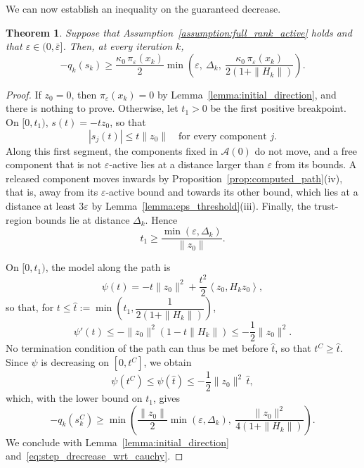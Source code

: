 \documentclass{article}
\numberwithin{equation}{section}
\newcommand{\calA}{{\mathcal{A}}}
\newcommand{\inner}[2]{\left\langle {#1} , {#2} \right\rangle} %
\theoremstyle{plain}
\newtheorem{theorem}{Theorem}
\begin{document}
We can now establish an inequality on the guaranteed decrease.
\begin{theorem}\label{theo:cauchy_decrease}
	Suppose that Assumption~\ref{assumption:full_rank_active} holds and that $\varepsilon \in (0,\bar\varepsilon]$. Then, at every iteration $k$,
	\begin{equation}\label{eq:bound_step_decrease}
		-q_k(s_k) \ge \frac{\kappa_0\,\pi_\varepsilon(x_k)}{2}\min\left(\varepsilon,\ \Delta_k,\ \frac{\kappa_0\,\pi_\varepsilon(x_k)}{2(1+\|H_k\|)}\right).
	\end{equation}
\end{theorem}
\begin{proof}
	If $z_0 = 0$, then $\pi_\varepsilon(x_k) = 0$ by Lemma~\ref{lemma:initial_direction}, and there is nothing to prove. Otherwise, let $t_1 > 0$ be the first positive breakpoint. On $[0,t_1)$, $s(t) = -tz_0$, so that
	\[|s_j(t)| \le t\|z_0\| \quad \text{for every component } j.\]
	Along this first segment, the components fixed in $\calA(0)$ do not move, and a free component that is not $\varepsilon$-active lies at a distance larger than $\varepsilon$ from its bounds. A released component moves inwards by Proposition~\ref{prop:computed_path}(iv), that is, away from its $\varepsilon$-active bound and towards its other bound, which lies at a distance at least $3\varepsilon$ by Lemma~\ref{lemma:eps_threshold}(iii). Finally, the trust-region bounds lie at distance $\Delta_k$. Hence
	\[t_1 \ge \frac{\min(\varepsilon,\Delta_k)}{\|z_0\|}.\]

	On $[0,t_1)$, the model along the path is
	\[\psi(t) = -t\|z_0\|^2 + \frac{t^2}{2}\inner{z_0}{H_kz_0},\]
	so that, for $t \le \hat{t} := \min\left(t_1, \dfrac{1}{2(1+\|H_k\|)}\right)$,
	\[\psi'(t) \le -\|z_0\|^2\left(1 - t\|H_k\|\right) \le -\frac{1}{2}\|z_0\|^2.\]
	No termination condition of the path can thus be met before $\hat{t}$, so that $t^C \ge \hat{t}$. Since $\psi$ is decreasing on $[0,t^C]$, we obtain
	\[\psi(t^C) \le \psi(\hat{t}) \le -\frac{1}{2}\|z_0\|^2\,\hat{t},\]
	which, with the lower bound on $t_1$, gives
	\[-q_k(s_k^C) \ge \min\left(\frac{\|z_0\|}{2}\min(\varepsilon,\Delta_k),\ \frac{\|z_0\|^2}{4(1+\|H_k\|)}\right).\]
	We conclude with Lemma~\ref{lemma:initial_direction} and~\eqref{eq:step_drecrease_wrt_cauchy}.
\end{proof}
\end{document}

